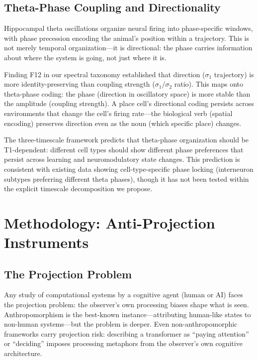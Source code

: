 \documentclass[12pt]{article}
\begin{document}
\subsection{Theta-Phase Coupling and Directionality}

Hippocampal theta oscillations organize neural firing into phase-specific windows, with phase precession encoding the animal's position within a trajectory. This is not merely temporal organization---it is directional: the phase carries information about where the system is going, not just where it is.

Finding F12 in our spectral taxonomy established that direction ($\sigma_1$ trajectory) is more identity-preserving than coupling strength ($\sigma_1/\sigma_2$ ratio). This maps onto theta-phase coding: the phase (direction in oscillatory space) is more stable than the amplitude (coupling strength). A place cell's directional coding persists across environments that change the cell's firing rate---the biological verb (spatial encoding) preserves direction even as the noun (which specific place) changes.

The three-timescale framework predicts that theta-phase organization should be T1-dependent: different cell types should show different phase preferences that persist across learning and neuromodulatory state changes. This prediction is consistent with existing data showing cell-type-specific phase locking (interneuron subtypes preferring different theta phases), though it has not been tested within the explicit timescale decomposition we propose.

\section{Methodology: Anti-Projection Instruments}

\subsection{The Projection Problem}

Any study of computational systems by a cognitive agent (human or AI) faces the projection problem: the observer's own processing biases shape what is seen. Anthropomorphism is the best-known instance---attributing human-like states to non-human systems---but the problem is deeper. Even non-anthropomorphic frameworks carry projection risk: describing a transformer as ``paying attention'' or ``deciding'' imposes processing metaphors from the observer's own cognitive architecture.
\end{document}

